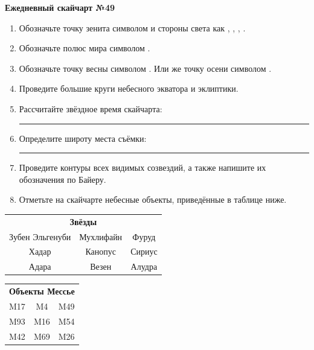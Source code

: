 \documentclass{./SAS-class-skygen}
\begin{document}
    
    
    
	\begin{center}
		\large\textbf{Ежедневный скайчарт №49}
	\end{center}

	\begin{enumerate}
		\item Обозначьте точку зенита символом  и стороны света как , , , .
		\item Обозначьте полюс мира символом .
		\item Обозначьте точку весны символом \Aries. Или же точку осени символом \Libra.
		\item Проведите большие круги небесного экватора и эклиптики.
		\item Рассчитайте звёздное время скайчарта: \rule{2cm}{0.4pt}
		\item Определите широту места съёмки: \rule{2cm}{0.4pt}
		\item Проведите контуры всех видимых созвездий, а также напишите их обозначения по Байеру.
		\item Отметьте на скайчарте небесные объекты, приведённые в таблице ниже.
	\end{enumerate}
	
    \vspace{0.5cm}

    \begin{table}[h!]
    \centering
    \begin{tabular}{ccc}
    \multicolumn{3}{c}{\textbf{Звёзды}} \\ Зубен Эльгенуби & Мухлифайн & Фуруд \\
Хадар & Канопус & Сириус \\
Адара & Везен & Алудра \\

\end{tabular}
    \hfill
    \begin{tabular}{ccc}
    \multicolumn{3}{c}{\textbf{Объекты Мессье}} \\ M17 & M4 & M49 \\
M93 & M16 & M54 \\
M42 & M69 & M26 \\

\end{tabular}
    \end{table}
	
\end{document}

